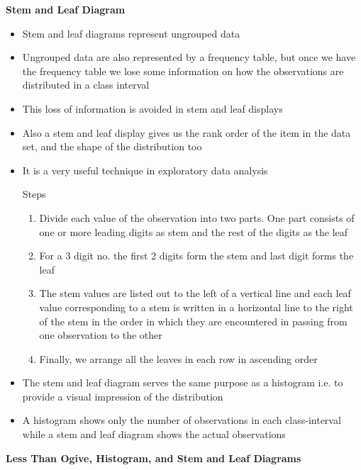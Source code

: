 \documentclass[
10pt, %
a4paper, %
]{report}
\begin{document}
\textbf{Stem and Leaf Diagram}

\begin{itemize}
\item Stem and leaf diagrams represent ungrouped data
\item Ungrouped data are also represented by a frequency table, but once we have the frequency table we lose some information on how the observations are distributed in a class interval
\item This loss of information is avoided in stem and leaf displays
\item Also a stem and leaf display gives us the rank order of the item in the data set, and the shape of the distribution too
\item It is a very useful technique in exploratory data analysis
\item[Steps]
\begin{enumerate}
\item Divide each value of the observation into two parts. One part consists of one or more leading digits as stem and the rest of the digits as the leaf
\item For a 3 digit no. the first 2 digits form the stem and last digit forms the leaf
\item The stem values are listed out to the left of a vertical line and each leaf value corresponding to a stem is written in a horizontal line to the right of the stem in the order in which they are encountered in passing from one observation to the other
\item Finally, we arrange all the leaves in each row in ascending order
\end{enumerate}
\item The stem and leaf diagram serves the same purpose as a histogram i.e. to provide a visual impression of the distribution
\item A histogram shows only the number of observations in each class-interval while a stem and leaf diagram shows the actual observations
\end{itemize}

\begin{center}
\textbf{Less Than Ogive, Histogram, and Stem and Leaf Diagrams}
\end{center}
\end{document}
